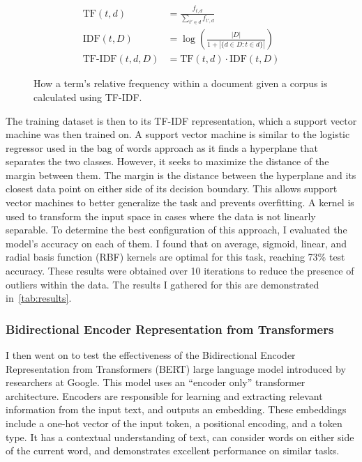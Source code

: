 \documentclass[twocolumn]{article}
\begin{document}
\begin{figure}
    \begin{align*}
        \text{TF}(t, d) &= \frac{f_{t, d}}{\sum_{t' \in d}f_{t',d}} \\ 
        \text{IDF}(t, D) &= \log \left( \frac{|D|}{1 + |\{d \in D : t \in d\}|} \right) \\ 
        \text{TF-IDF}(t, d, D) &= \text{TF}(t, d) \cdot \text{IDF}(t, D) 
    \end{align*}
    \caption{How a term's relative frequency within a document given a corpus is calculated using TF-IDF.}
    \label{eq:tfidf}
\end{figure}

The training dataset is then to its TF-IDF representation, which a support vector machine was then trained on. A support vector machine is similar to the logistic regressor used in the bag of words approach as it finds a hyperplane that separates the two classes. However, it seeks to maximize the distance of the margin between them. The margin is the distance between the hyperplane and its closest data point on either side of its decision boundary. This allows support vector machines to better generalize the task and prevents overfitting. A kernel is used to transform the input space in cases where the data is not linearly separable. To determine the best configuration of this approach, I evaluated the model's accuracy on each of them. I found that on average, sigmoid, linear, and radial basis function (RBF) kernels are optimal for this task, reaching 73\% test accuracy. These results were obtained over 10 iterations to reduce the presence of outliers within the data. The results I gathered for this are demonstrated in~\autoref{tab:results}.

\subsubsection{Bidirectional Encoder Representation from Transformers}

I then went on to test the effectiveness of the Bidirectional Encoder Representation from Transformers (BERT) large language model introduced by researchers at Google. This model uses an ``encoder only'' transformer architecture. Encoders are responsible for learning and extracting relevant information from the input text, and outputs an embedding. These embeddings include a one-hot vector of the input token, a positional encoding, and a token type. It has a contextual understanding of text, can consider words on either side of the current word, and demonstrates excellent performance on similar tasks. 
\end{document}
